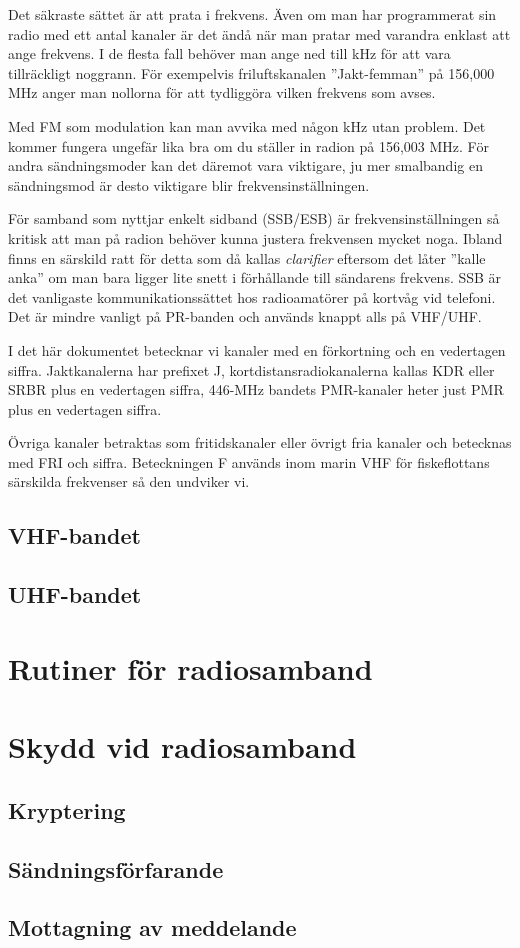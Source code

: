 \documentclass[12ypt,swedish,a4paper]{report}
\begin{document}
Det säkraste sättet är att prata i frekvens. Även om man har programmerat sin radio med ett antal kanaler är det ändå när man pratar med varandra enklast att ange frekvens. I de flesta fall behöver man ange ned till kHz för att vara tillräckligt noggrann. För exempelvis friluftskanalen ''Jakt-femman'' på 156,000 MHz anger man nollorna för att tydliggöra vilken frekvens som avses.

Med FM som modulation kan man avvika med någon kHz utan problem. Det kommer fungera ungefär lika bra om du ställer in radion på 156,003 MHz. För andra sändningsmoder kan det däremot vara viktigare, ju mer smalbandig en sändningsmod är desto viktigare blir frekvensinställningen.

För samband som nyttjar enkelt sidband (SSB/ESB) är frekvensinställningen så kritisk att man på radion behöver kunna justera frekvensen mycket noga. Ibland finns en särskild ratt för detta som då kallas \textit{clarifier} eftersom det låter ''kalle anka'' om man bara ligger lite snett i förhållande till sändarens frekvens. SSB är det vanligaste kommunikationssättet hos radioamatörer på kortvåg vid telefoni. Det är mindre vanligt på PR-banden och används knappt alls på VHF/UHF.

I det här dokumentet betecknar vi kanaler med en förkortning och en vedertagen siffra. Jaktkanalerna har prefixet J, kortdistansradiokanalerna kallas KDR eller SRBR plus en vedertagen siffra, 446-MHz bandets PMR-kanaler heter just PMR plus en vedertagen siffra.

Övriga kanaler betraktas som fritidskanaler eller övrigt fria kanaler och betecknas med FRI och siffra. Beteckningen F används inom marin VHF för fiskeflottans särskilda frekvenser så den undviker vi.

\section{VHF-bandet}

\section{UHF-bandet}

\chapter{Rutiner för radiosamband}

\chapter{Skydd vid radiosamband}

\section{Kryptering}

\section{Sändningsförfarande}

\section{Mottagning av meddelande}
\end{document}
